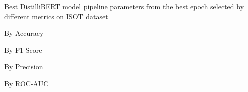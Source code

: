 \begin{table}[!htbp]
    \caption{Best DistilliBERT model pipeline parameters from the best epoch selected by different metrics on ISOT dataset}
    \label{tab:isot_distillibert_pipeline_params}
    \centering

    \begin{subtable}[t]{0.48\linewidth}
        \scriptsize
        \caption{By Accuracy}
        
    \end{subtable}
    \hfill
    \begin{subtable}[t]{0.48\linewidth}
        \scriptsize
        \caption{By F1-Score}
        
    \end{subtable}

    \vspace{1em}

    \begin{subtable}[t]{0.48\linewidth}
        \scriptsize
        \caption{By Precision}
        
    \end{subtable}
    \hfill
    \begin{subtable}[t]{0.48\linewidth}
        \scriptsize
        \caption{By ROC-AUC}
        
    \end{subtable}

\end{table}